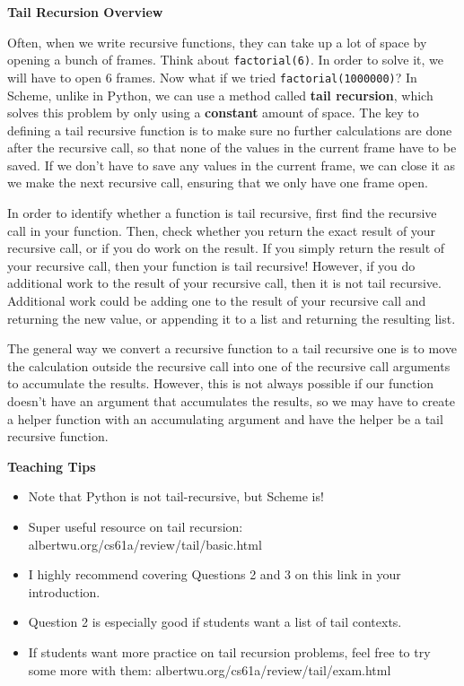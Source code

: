 \textbf{Tail Recursion Overview }

Often, when we write recursive functions, they can take up a lot of space by opening a bunch of frames. Think about \texttt{factorial(6)}. In order to solve it, we will have to open 6 frames. Now what if we tried \texttt{factorial(1000000)}? In Scheme, unlike in Python, we can use a method called \textbf{tail recursion}, which solves this problem by only using a \textbf{constant} amount of space. The key to defining a tail recursive function is to make sure no further calculations are done after the recursive call, so that none of the values in the current frame have to be saved. If we don’t have to save any values in the current frame, we can close it as we make the next recursive call, ensuring that we only have one frame open. 

In order to identify whether a function is tail recursive, first find the recursive call in your function. Then, check whether you return the exact result of your recursive call, or if you do work on the result. If you simply return the result of your recursive call, then your function is tail recursive! However, if you do additional work to the result of your recursive call, then it is not tail recursive. Additional work could be adding one to the result of your recursive call and returning the new value, or appending it to a list and returning the resulting list.

The general way we convert a recursive function to a tail recursive one is to move the calculation outside the recursive call into one of the recursive call arguments to accumulate the results. However, this is not always possible if our function doesn’t have an argument that accumulates the results, so we may have to create a helper function with an accumulating argument and have the helper be a tail recursive function.

\begin{guide}
\begin{blocksection}
\textbf{Teaching Tips}
  \begin{itemize}
    \item Note that Python is not tail-recursive, but Scheme is!
    \item Super useful resource on tail recursion: albertwu.org/cs61a/review/tail/basic.html
    \item I highly recommend covering Questions 2 and 3 on this link in your introduction.
    \item Question 2 is especially good if students want a list of tail contexts.
    \item If students want more practice on tail recursion problems, feel free to try some more with them: albertwu.org/cs61a/review/tail/exam.html
  \end{itemize}
\end{blocksection}
\end{guide}
